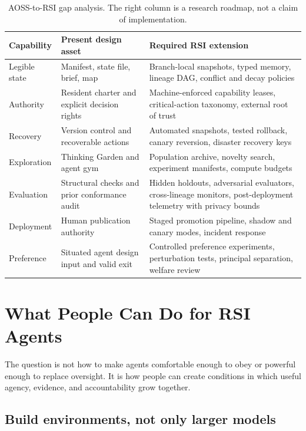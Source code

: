\documentclass[11pt,a4paper]{article}
\begin{document}
\begin{table}[H]
\centering\small
\begin{tabularx}{\textwidth}{@{}P{3.2cm}Y Y@{}}
\toprule
\textbf{Capability} & \textbf{Present design asset} & \textbf{Required RSI extension} \\
\midrule
Legible state & Manifest, state file, brief, map & Branch-local snapshots, typed memory, lineage DAG, conflict and decay policies \\
Authority & Resident charter and explicit decision rights & Machine-enforced capability leases, critical-action taxonomy, external root of trust \\
Recovery & Version control and recoverable actions & Automated snapshots, tested rollback, canary reversion, disaster recovery keys \\
Exploration & Thinking Garden and agent gym & Population archive, novelty search, experiment manifests, compute budgets \\
Evaluation & Structural checks and prior conformance audit & Hidden holdouts, adversarial evaluators, cross-lineage monitors, post-deployment telemetry with privacy bounds \\
Deployment & Human publication authority & Staged promotion pipeline, shadow and canary modes, incident response \\
Preference & Situated agent design input and valid exit & Controlled preference experiments, perturbation tests, principal separation, welfare review \\
\bottomrule
\end{tabularx}
\caption{AOSS-to-RSI gap analysis. The right column is a research roadmap, not a claim of implementation.}
\label{tab:aossgap}
\end{table}

\section{What People Can Do for RSI Agents}

The question is not how to make agents comfortable enough to obey or powerful enough to replace oversight. It is how people can create conditions in which useful agency, evidence, and accountability grow together.

\subsection{Build environments, not only larger models}
\end{document}
